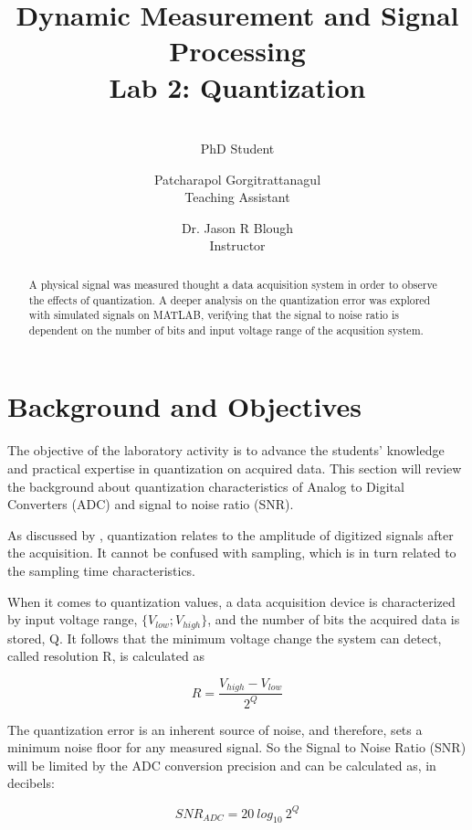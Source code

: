 \documentclass[10pt,letterpaper,twocolumn]{article}
\author{\makebox[.9\textwidth]{Guilherme Aramizo Ribeiro}\\PhD Student 
\and Patcharapol Gorgitrattanagul \\Teaching Assistant \and Dr. Jason R Blough\\Instructor}
\title{Dynamic Measurement and Signal Processing \\Lab 2: Quantization}
\begin{document}
\maketitle

\begin{abstract}
    A physical signal was measured thought a data acquisition system in order to observe the effects of quantization. A deeper analysis on the quantization error was explored with simulated signals on MATLAB, verifying that the signal to noise ratio is dependent on the number of bits and input voltage range of the acqusition system.
\end{abstract}

\section{Background and Objectives}
    
    The objective of the laboratory activity is to advance the students' knowledge and practical expertise in quantization on acquired data. This section will review the background about quantization characteristics of Analog to Digital Converters (ADC) and signal to noise ratio (SNR).
    
    As discussed by \cite{smith}, quantization relates to the amplitude of digitized signals after the acquisition. It cannot be confused with sampling, which is in turn related to the sampling time characteristics.
    
    When it comes to quantization values, a data acquisition device is characterized by input voltage range, $\{V_{low}; V_{high}\}$, and the number of bits the acquired data is stored, Q. It follows that the minimum voltage change the system can detect, called resolution R, is calculated as
    
    \begin{equation}
        R = \dfrac{V_{high} - V_{low}}{2^Q}
        \label{eq:resolution}
    \end{equation}
    
    The quantization error is an inherent source of noise, and therefore, sets a minimum noise floor for any measured signal. So the Signal to Noise Ratio (SNR) will be limited by the ADC conversion precision and can be calculated as, in decibels:
    
    \begin{equation}
        SNR_{ADC} = 20\ log_{10}\ 2^Q
    \end{equation}
\end{document}
